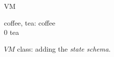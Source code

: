 \begin{figure}[H]
\centering
\begin{class}{VM}
\begin{state}
coffee, tea: \integer
{} \leq  coffee 
\\
0 \leq  tea 
\end{state} 
\end{class}
\caption{$VM$ class: adding the \textit{state schema}.}
\label{oz_vm_state_schema}
\end{figure}